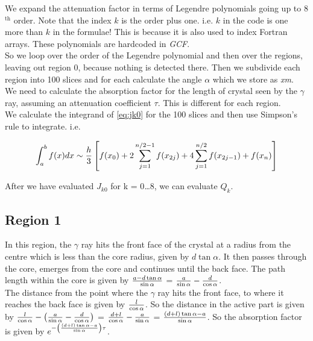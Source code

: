 \noindent We expand the attenuation factor in terms of Legendre
polynomials going up to 8$^\textrm{th}$ order. Note that the index $k$
is the order plus one. i.e. $k$ in the code is one more than $k$ in
the formulae! This is because it is also used to index Fortran arrays.
These polynomials are hardcoded in {\em GCF}.\\

\noindent So we loop over the order of the Legendre polynomial and
then over the regions, leaving out region 0, because nothing is
detected there. Then we subdivide each region into 100 slices and for
each calculate the angle $\alpha$ which we store as {\em xm}.\\

\noindent We need to calculate the absorption factor for the length of
crystal seen by the $\gamma$ ray, assuming an attenuation coefficient
$\tau$. This is different for each region.\\

\noindent We calculate the integrand of \ref{eq:jk0} for the 100
slices and then use Simpson's rule to integrate. i.e.

\begin{equation}
\int_a^b f(x) dx \sim {h \over 3}
\left[
f(x_0)
+ 2 \displaystyle\sum_{j = 1}^{n/2 - 1} f(x_{2j})
+ 4 \displaystyle\sum_{j = 1}^{n/2} f(x_{2j-1})
+ f(x_n)
\right]
\end{equation}

\noindent After we have evaluated $J_{k0}$ for k = 0{\ldots}8, we can
evaluate $Q_k$.

\subsection{Region 1}

\noindent In this region, the $\gamma$ ray hits the front face of the
crystal at a radius from the centre which is less than the core
radius, given by $d\tan\alpha$. It then passes through the core,
emerges from the core and continues until the back face. The path length
within the core is given by $a - d\tan\alpha\over\sin\alpha$ = 
${a\over\sin\alpha} - {d\over\cos\alpha}$.\\

\noindent The distance from the point where the $\gamma$ ray hits the
front face, to where it reaches the back face is given by $l \over
\cos\alpha$. So the distance in the active part is given by
${l \over \cos\alpha} - \left({a\over\sin\alpha} -
{d\over\cos\alpha}\right)$ =
${d + l \over \cos\alpha} - {a\over\sin\alpha}$ = 
${(d + l) \tan\alpha - a \over \sin\alpha}$. So the absorption factor
is given by $e^{-{\left((d + l) \tan\alpha - a \over
\sin\alpha\right)\tau}}$.

